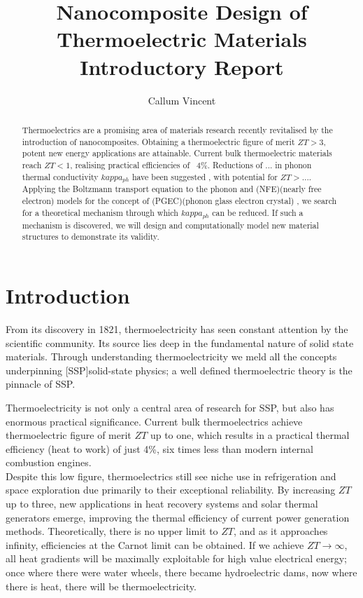 \documentclass[a4paper,12pt]{article}
\begin{document}
\title{Nanocomposite Design of Thermoelectric Materials\\Introductory Report}
\author{Callum Vincent}
\maketitle


\begin{abstract}
Thermoelectrics are a promising area of materials research recently revitalised by the introduction of nanocomposites. Obtaining a thermoelectric figure of merit $ZT > 3$, potent new energy applications are attainable. Current bulk thermoelectric materials reach $ZT < 1$, realising practical efficiencies of ~4\%. Reductions of ... in phonon thermal conductivity $kappa_{ph}$ have been suggested \cite{crc-handbook}, with potential for $ZT > ...$. Applying the Boltzmann transport equation to the phonon and (NFE)(nearly free electron) models for the concept of (PGEC)(phonon glass electron crystal) \cite{crc-handbook}, we search for a theoretical mechanism through which $kappa_{ph}$ can be reduced. If such a mechanism is discovered, we will design and computationally model new material structures to demonstrate its validity.
\end{abstract}


\section{Introduction}

From its discovery in 1821, thermoelectricity has seen constant
attention by the scientific community. Its source lies deep in the
fundamental nature of solid state materials. Through understanding
thermoelectricity we meld all the concepts underpinning
[SSP]{solid-state physics}; a well defined thermoelectric
theory is the pinnacle of \ac{SSP}.


Thermoelectricity is not only a central area of research for
\ac{SSP}, but also has enormous practical significance. Current
bulk thermoelectrics achieve thermoelectric figure of merit $ZT$ up to
one, which results in a practical thermal efficiency (heat to work) of
just 4\%, six times less than modern internal combustion engines.\\
Despite this low figure, thermoelectrics still see niche use
in refrigeration and space exploration due primarily to their
exceptional reliability. By increasing $ZT$ up to three, new
applications in heat recovery systems and solar thermal generators
emerge, improving the thermal efficiency of current power generation
methods. Theoretically, there is no upper limit to $ZT$, and as it
approaches infinity, efficiencies at the Carnot limit can be obtained.
If we achieve $ZT \to\infty$, all heat gradients will be maximally
exploitable for high value electrical energy; once where there were
water wheels, there became hydroelectric dams, now where there is
heat, there will be thermoelectricity.
\end{document}
